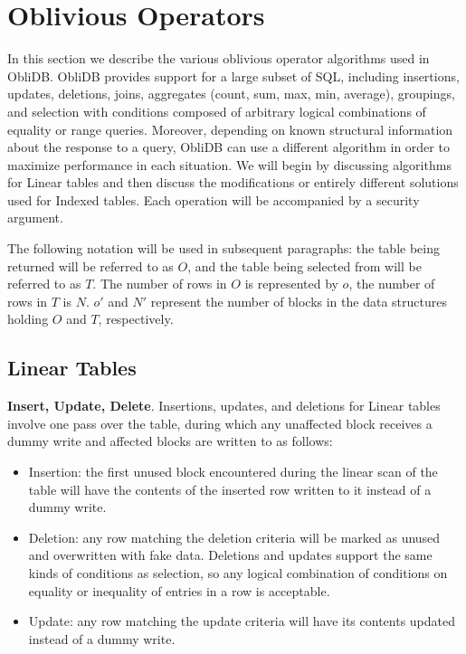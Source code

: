 \documentclass[letterpaper,twocolumn,10pt]{article}
\def\name/{ObliDB}
\begin{document}
\section{Oblivious Operators}\label{oblivOps}
In this section we describe the various oblivious operator algorithms used in \name/. \name/ provides support for a large subset of SQL, including insertions, updates, deletions, joins, aggregates (count, sum, max, min, average), groupings, and selection with conditions composed of arbitrary logical combinations of equality or range queries. Moreover, depending on known structural information about the response to a query, \name/ can use a different algorithm in order to maximize performance in each situation. We will begin by discussing algorithms for Linear tables and then discuss the modifications or entirely different solutions used for Indexed tables. Each operation will be accompanied by a security argument. 

The following notation will be used in subsequent paragraphs: the table being returned will be referred to as $O$, and the table being selected from will be referred to as $T$. The number of rows in $O$ is represented by $o$, the number of rows in $T$ is $N$. $o'$ and $N'$ represent the number of blocks in the data structures holding $O$ and $T$, respectively. 

\subsection{Linear Tables}
  \noindent \textbf{Insert, Update, Delete}. 
Insertions, updates, and deletions for Linear tables involve one pass over the table, during which any unaffected block receives a dummy write and affected blocks are written to as follows:
\begin{itemize}[itemsep=0pt,parsep=0pt]
\item Insertion: the first unused block encountered during the linear scan of the table will have the contents of the inserted row written to it instead of a dummy write.
\item Deletion: any row matching the deletion criteria will be marked as unused and overwritten with fake data. Deletions and updates support the same kinds of conditions as selection, so any logical combination of conditions on equality or inequality of entries in a row is acceptable. 
\item Update: any row matching the update criteria will have its contents updated instead of a dummy write. 
\end{itemize}
\end{document}

